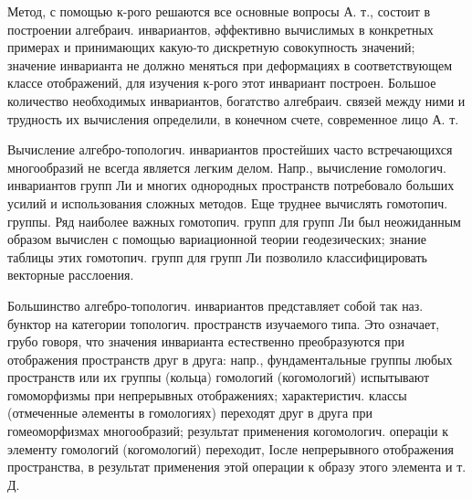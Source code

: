 \documentclass[10pt]{article}
\begin{document}
Метод, с помощью к-рого решаются все основные вопросы А. т., состоит в построении алгебраич. инвариантов, әффективно вычислимых в конкретных примерах и принимающих какую-то дискретную совокупность значений; значение инварианта не должно меняться при деформациях в соответствующем классе отображений, для изучения к-рого этот инвариант построен. Большое количество необходимых инвариантов, богатство алгебраич. связей между ними и трудность их вычисления определили, в конечном счете, современное лицо А. т.



Вычисление алгебро-топологич. инвариантов простейших часто встречающихся многообразий не всегда является легким делом. Напр., вычисление гомологич. инвариантов групп Ли и многих однородных пространств потребовало больших усилий и использования сложных методов. Еще труднее вычислять гомотопич. группы. Ряд наиболее важных гомотопич. групп для групп Ли был неожиданным образом вычислен с помощью вариационной теории геодезических; знание таблицы этих гомотопич. групп для групп Ли позволило классифицировать векторные расслоения.



Большинство алгебро-топологич. инвариантов представляет собой так наз. бунктор на категории топологич. пространств изучаемого типа. Это означает, грубо говоря, что значения инварианта естественно преобразуются при отображения пространств друг в друга: напр., фундаментальные группы любых пространств или их группы (кольца) гомологий (когомологий) испытывают гомоморфизмы при непрерывных отображениях; характеристич. классы (отмеченные әлементы в гомологиях) переходят друг в друга при гомеоморфизмах многообразий; результат применения когомологич. операціи к элементу гомологий (когомологий) переходит, Іосле непрерывного отображения пространства, в результат применения этой операции к образу этого элемента и т. Д.
\end{document}
